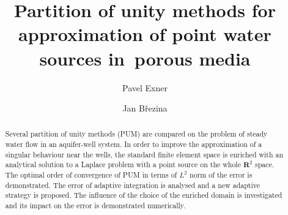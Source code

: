 \documentclass{elsarticle}
\newcommand{\R}{\mathbf{R}}
\begin{document}
\begin{frontmatter}



\title{Partition of unity methods for approximation of point water sources in~porous media}


\author[adr]{Pavel Exner}

\author[adr]{Jan B{\v r}ezina}

\address[adr]{Technical University of Liberec, Studentsk{\' a} 1402/2, 461 17 Liberec 1, Czech Republic}


\begin{abstract}

Several partition of unity methods (PUM) are compared on the problem of steady water flow in an aquifer-well system. 
In order to improve the approximation of a singular behaviour near the wells, the standard finite element space is enriched with
an analytical solution to a Laplace problem with a point source on the whole $\R^2$ space. The optimal order of 
convergence of PUM in terms of $L^2$ norm of the error is demonstrated. 
The error of adaptive integration is analysed and a new adaptive strategy is proposed. The influence of the choice
of the enriched domain is investigated and its impact on the error is demonstrated numerically.


\end{abstract}
\end{frontmatter}
\end{document}

